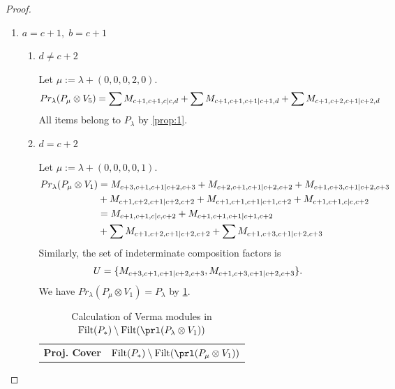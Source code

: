 \begin{proof}
\begin{enumerate}
  \item $a=c+1,\;b = c+1$
    \begin{enumerate}
      \item $ d\neq c+2 $\par
        Let $\mu:=\lambda + (0,0,0,2,0) $.
        \begin{equation}\notag
          \begin{aligned}
            Pr_{\lambda}(P_\mu \otimes V_{5}) &=
\sum M_{c+1,c+1,c|c,d}
+ \sum M_{c+1,c+1,c+1|c+1,d}
+ \sum M_{c+1,c+2,c+1|c+2,d}
          \end{aligned}
        \end{equation}
All items belong to $P_\lambda$ by \cref{prop:1}.

      \item $ d = c+2 $\par
        Let $\mu:=\lambda + (0,0,0,0,1) $.
        \begin{equation}\notag
          \begin{aligned}
            Pr_{\lambda}(P_\mu \otimes V_{1}) &=
M_{c+3,c+1,c+1|c+2,c+3}
+ M_{c+2,c+1,c+1|c+2,c+2}
+ M_{c+1,c+3,c+1|c+2,c+3}\\
                                               &
+ M_{c+1,c+2,c+1|c+2,c+2}
+ M_{c+1,c+1,c+1|c+1,c+2}
+ M_{c+1,c+1,c|c,c+2} \\
                                               &=
 M_{c+1,c+1,c|c,c+2}
+  M_{c+1,c+1,c+1|c+1,c+2}\\
                                               &
+ \sum M_{c+1,c+2,c+1|c+2,c+2}
+ \sum M_{c+1,c+3,c+1|c+2,c+3}
          \end{aligned}
        \end{equation}
      Similarly, the set of indeterminate composition factors is 
\begin{equation}\notag
  \begin{aligned}
    U = \{
M_{c+3,c+1,c+1|c+2,c+3},
M_{c+1,c+3,c+1|c+2,c+3}
\}.
  \end{aligned}
\end{equation}
       We have $Pr_{\lambda}(P_\mu \otimes V_{1}) = P_\lambda  $ by \cref{tab:verma-analysis_1_a_45}.
\begin{table}[htbp]
\centering
\caption{Calculation of Verma modules in $\operatorname{Filt}(P_*) \setminus \operatorname{Filt}(\prl(P_\lambda \otimes V_{1})) $ } \label{tab:verma-analysis_1_a_45}
\begin{tabular}{cc}
\toprule
\textbf{Proj. Cover} & \textbf{$\operatorname{Filt}(P_*) \setminus \operatorname{Filt}(\prl(P_\mu \otimes V_{1})) $}  \\

\end{tabular}
\end{table}
\end{enumerate}
\end{enumerate}
\end{proof}
